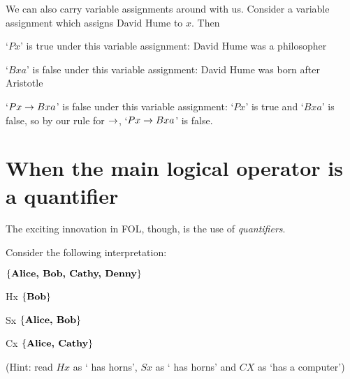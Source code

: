 We can also carry variable assignments around with us. Consider a variable assignment which assigns David Hume to $x$. Then \begin{ebullet}
\item `$Px$' is true under this variable assignment: David Hume was a philosopher
\item `$Bxa$' is false under this variable assignment: David Hume was born after Aristotle
\item `$Px\eif Bxa$' is false under this variable assignment: `$Px$' is true and `$Bxa$' is false, so by our rule for $\eif$, `$Px\eif Bxa$' is false.
\end{ebullet}


\section{When the main logical operator is a quantifier}
The exciting innovation in FOL, though, is the use of \emph{quantifiers}.

Consider the following interpretation:
\begin{center}

\begin{ekey}\item[\text{domain}] $\{\text{\emph{Alice, Bob, Cathy, Denny}}\}$
\item[Hx] $\{\text{\emph{Bob}}\}$
\item[Sx] $\{\text{\emph{Alice, Bob}}\}$
\item[Cx]$\{\text{\emph{Alice, Cathy}}\}$
\end{ekey}
\end{center}
(Hint: read $Hx$ as ` has horns', $Sx$ as ` has horns' and $CX$ as `has a computer')\\

